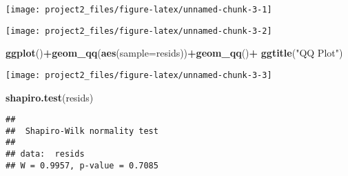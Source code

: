 \documentclass[]{article}
\newenvironment{Shaded}{\begin{snugshade}}{\end{snugshade}}
\newcommand{\CommentTok}[1]{\textcolor[rgb]{0.56,0.35,0.01}{\textit{#1}}}
\newcommand{\DataTypeTok}[1]{\textcolor[rgb]{0.13,0.29,0.53}{#1}}
\newcommand{\DecValTok}[1]{\textcolor[rgb]{0.00,0.00,0.81}{#1}}
\newcommand{\KeywordTok}[1]{\textcolor[rgb]{0.13,0.29,0.53}{\textbf{#1}}}
\newcommand{\NormalTok}[1]{#1}
\newcommand{\OperatorTok}[1]{\textcolor[rgb]{0.81,0.36,0.00}{\textbf{#1}}}
\newcommand{\StringTok}[1]{\textcolor[rgb]{0.31,0.60,0.02}{#1}}
\begin{document}
\begin{center}\texttt{[image: project2\_files/figure-latex/unnamed-chunk-3-1]} \end{center}

\begin{Shaded}
\end{Shaded}

\begin{center}\texttt{[image: project2\_files/figure-latex/unnamed-chunk-3-2]} \end{center}

\begin{Shaded}
\begin{Highlighting}[]
\KeywordTok{ggplot}\NormalTok{()}\OperatorTok{+}\KeywordTok{geom_qq}\NormalTok{(}\KeywordTok{aes}\NormalTok{(}\DataTypeTok{sample=}\NormalTok{resids))}\OperatorTok{+}\KeywordTok{geom_qq}\NormalTok{()}\OperatorTok{+}
\StringTok{  }\KeywordTok{ggtitle}\NormalTok{(}\StringTok{"QQ Plot"}\NormalTok{)}
\end{Highlighting}
\end{Shaded}

\begin{center}\texttt{[image: project2\_files/figure-latex/unnamed-chunk-3-3]} \end{center}

\begin{Shaded}
\begin{Highlighting}[]
\KeywordTok{shapiro.test}\NormalTok{(resids)}
\end{Highlighting}
\end{Shaded}

\begin{verbatim}
## 
##  Shapiro-Wilk normality test
## 
## data:  resids
## W = 0.9957, p-value = 0.7085
\end{verbatim}

\begin{Shaded}
\end{Shaded}
\end{document}
